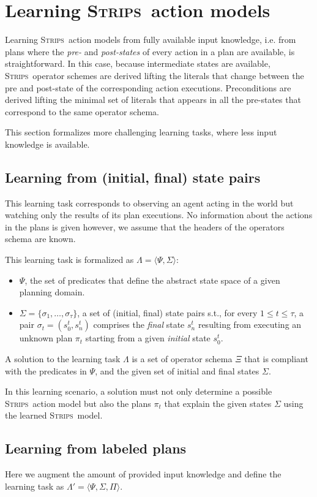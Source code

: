 \documentclass[letterpaper]{article} %
\newcommand{\tup}[1]{{\langle #1 \rangle}}
\newcommand{\strips}{\textsc{Strips}}     %
\begin{document}
\section{Learning \strips\ action models}
Learning \strips\ action models from fully available input knowledge, i.e. from plans where the {\em pre-} and {\em post-states} of every action in a plan are available, is straightforward. In this case, because intermediate states are available, \strips\ operator schemes are derived lifting the literals that change between the pre and post-state of the corresponding action executions. Preconditions are derived lifting the minimal set of literals that appears in all the pre-states that correspond to the same operator schema.

This section formalizes more challenging learning tasks, where less input knowledge is available.

\subsection{Learning from (initial, final) state pairs}
This learning task corresponds to observing an agent acting in the world but watching only the results of its plan executions. No information about the actions in the plans is given however, we assume that the headers of the operators schema are known.

This learning task is formalized as $\Lambda=\tup{\Psi,\Sigma}$:
\begin{itemize}
\item $\Psi$, the set of predicates that define the abstract state space of a given planning domain.
\item $\Sigma=\{\sigma_1,\ldots,\sigma_{\tau}\}$, a set of (initial, final) state pairs s.t., for every {\tt\small $1\leq t\leq \tau$}, a pair $\sigma_t=(s_0^t,s_{n}^t)$ comprises the {\em final} state $s_{n}^t$ resulting from executing an unknown plan $\pi_t$ starting from a given {\em initial} state $s_0^t$.
\end{itemize}

A solution to the learning task $\Lambda$  is a set of operator schema $\Xi$ that is compliant with the predicates in $\Psi$, and the given set of initial and final states $\Sigma$.

In this learning scenario, a solution must not only determine a possible \strips\ action model but also the plans $\pi_t$ that explain the given states $\Sigma$ using the learned \strips\ model.

\subsection{Learning from labeled plans}
Here we augment the amount of provided input knowledge and define the learning task as $\Lambda'=\tup{\Psi,\Sigma,\Pi}$.
\end{document}
